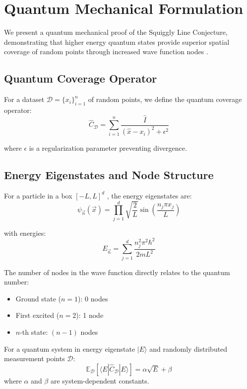 \section{Quantum Mechanical Formulation}
\label{sec:quantum_theory}

We present a quantum mechanical proof of the Squiggly Line Conjecture, demonstrating that higher energy quantum states provide superior spatial coverage of random points through increased wave function nodes \cite{Dirac1982PrinciplesOQ}.

\subsection{Quantum Coverage Operator}

For a dataset $\mathcal{D} = \{x_i\}_{i=1}^n$ of random points, we define the quantum coverage operator:
$$\hat{C}_\mathcal{D} = \sum_{i=1}^n \frac{\hat{I}}{(\hat{x} - x_i)^2 + \epsilon^2}$$

where $\epsilon$ is a regularization parameter preventing divergence.

\subsection{Energy Eigenstates and Node Structure}

For a particle in a box $[-L, L]^d$ \cite{Sakurai1986ModernQM}, the energy eigenstates are:
$$\psi_{\vec{n}}(\vec{x}) = \prod_{j=1}^d \sqrt{\frac{2}{L}} \sin\left(\frac{n_j \pi x_j}{L}\right)$$

with energies:
$$E_{\vec{n}} = \sum_{j=1}^d \frac{n_j^2 \pi^2 \hbar^2}{2mL^2}$$

The number of nodes in the wave function directly relates to the quantum number:
\begin{itemize}
    \item Ground state ($n=1$): 0 nodes
    \item First excited ($n=2$): 1 node  
    \item $n$-th state: $(n-1)$ nodes
\end{itemize}

\begin{theorem}
For a quantum system in energy eigenstate $|E\rangle$ and randomly distributed measurement points $\mathcal{D}$:
$$\mathbb{E}_\mathcal{D}[\langle E | \hat{C}_\mathcal{D} | E \rangle] = \alpha \sqrt{E} + \beta$$
where $\alpha$ and $\beta$ are system-dependent constants.
\end{theorem}

